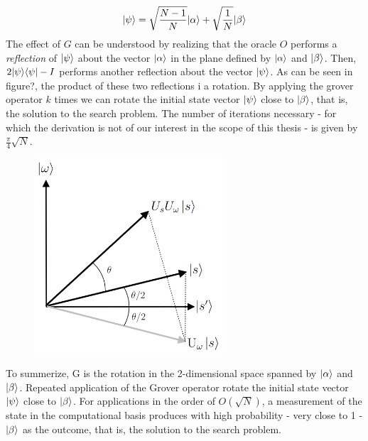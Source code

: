 \begin{equation}
  {|{\psi}\rangle}= \sqrt{\frac{N-1}{N}}{|{\alpha}\rangle} + \sqrt{\frac{1}{N}}{|{\beta}\rangle}
\end{equation}
The effect of $G$ can be understood by realizing that the oracle $O$ performs a \textit{reflection} of ${|{\psi}\rangle}$ about the vector ${|{\alpha}\rangle}$ in the plane defined by ${|{\alpha}\rangle}$ and ${|{\beta}\rangle}$. Then, $2{|{\psi}\rangle}{\langle{\psi}|}-I$ performs another reflection about the vector ${|{\psi}\rangle}$. As can be seen in figure?, the product of these two reflections i a rotation. By applying the grover operator $k$ times we can rotate the initial state vector ${|{\psi}\rangle}$ close to ${|{\beta}\rangle}$, that is, the solution to the search problem. The number of iterations necessary - for which the derivation is not of our interest in the scope of this thesis - is given by $\frac{\pi}{4}\sqrt{N}$.
\begin{figure}[ht]
  \centering
  \includegraphics[width=70mm]{figures/chapter1/grover_reflection}
  \label{fig:grover_operator}
\end{figure}


\noindent
To summerize, G is the rotation in the 2-dimensional space spanned by ${|{\alpha}\rangle}$ and ${|{\beta}\rangle}$. Repeated application of the Grover operator rotate the initial state vector ${|{\psi}\rangle}$ close to ${|{\beta}\rangle}$. For applications in the order of $O(\sqrt{N})$, a measurement of the state in the computational basis produces with high probability - very close to 1 - ${|{\beta}\rangle}$ as the outcome, that is, the solution to the search problem.


